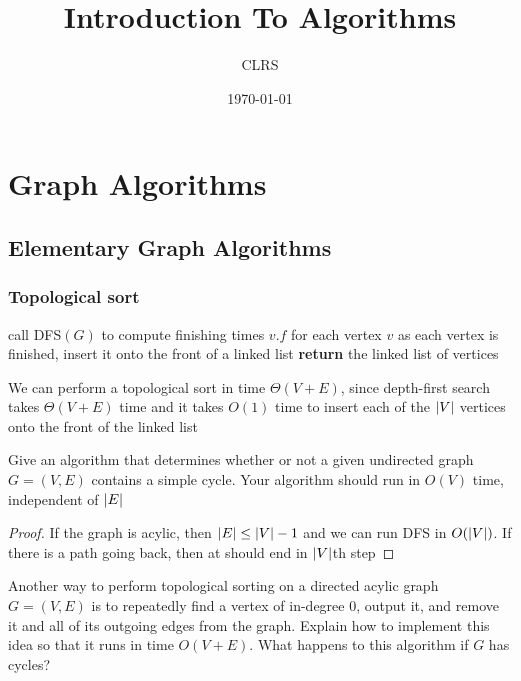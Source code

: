 \documentclass[11pt]{article}
\author{CLRS}
\date{\today}
\title{Introduction To Algorithms}
\begin{document}
\maketitle
\tableofcontents



\section{Graph Algorithms}
\label{sec:org4cc080e}
\subsection{Elementary Graph Algorithms}
\label{sec:orgb718ed8}
\subsubsection{Topological sort}
\label{sec:org66618ae}
\begin{algorithmic}[1]
\State call DFS\((G)\) to compute finishing times \(v.f\) for each vertex \(v\)
\State as each vertex is finished, insert it onto the front of a linked list
\State \textbf{return} the linked list of vertices
\EndProcedure
\end{algorithmic}

We can perform a topological sort in time \(\Theta(V+E)\), since depth-first search takes \(\Theta(V+E)\)
time and it takes \(O(1)\) time to insert each of the \(\abs{V}\) vertices onto the front of the
linked list

\begin{exercise}[22.4-3]
Give an algorithm that determines whether or not a given undirected graph \(G=(V,E)\) contains a
simple cycle. Your algorithm should run in \(O(V)\) time, independent of \(\abs{E}\)
\end{exercise}

\begin{proof}
If the graph is acylic, then \(\abs{E}\le\abs{V}-1\) and we can run DFS in \(O(\abs{V})\). If
there is a path going back, then at should end in \(\abs{V}\)th step
\end{proof}

\begin{exercise}[22.4-5]
Another way to perform topological sorting on a directed acylic graph \(G=(V,E)\) is to
repeatedly find a vertex of in-degree 0, output it, and remove it and all of its outgoing edges
from the graph. Explain how to implement this idea so that it runs in time \(O(V+E)\). What
happens to this algorithm if \(G\) has cycles?
\end{exercise}
\end{document}

